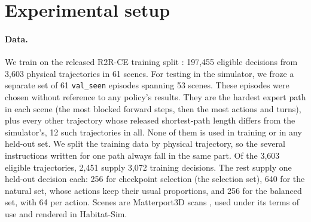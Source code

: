 \section{Experimental setup}
\label{sec:data}
\label{sec:protocol}

\paragraph{Data.}
We train on the released R2R-CE training split \citep{krantz2020beyond}: 197,455 eligible decisions
from 3,603 physical trajectories in 61 scenes. For testing in the simulator, we froze a separate set
of 61 \texttt{val\_seen} episodes spanning 53 scenes. These episodes were chosen without reference to
any policy's results. They are the hardest expert path in each scene (the most blocked forward
steps, then the most actions and turns), plus every other trajectory whose released shortest-path
length differs from the simulator's, 12 such trajectories in all. None of them is used in training or in
any held-out set. We split the training data by physical trajectory, so the several instructions
written for one path always fall in the same part. Of the 3,603 eligible trajectories, 2,451 supply
3,072 training decisions. The rest supply one held-out decision each: 256 for checkpoint selection
(the selection set), 640 for the natural set, whose actions keep their usual proportions, and 256 for the balanced set,
with 64 per action.
Scenes are Matterport3D scans \citep{chang2017matterport3d}, used under its terms of use
\citep{matterport2017tos} and rendered in Habitat-Sim.

